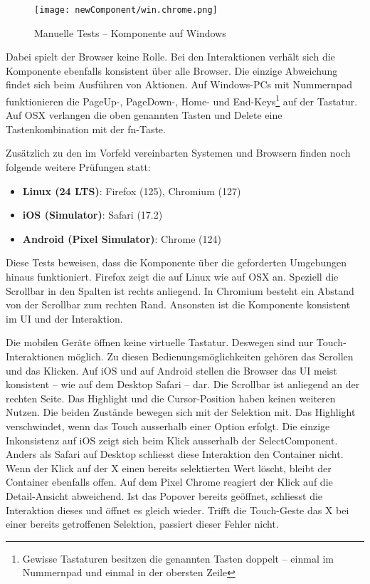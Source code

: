 \begin{figure}[!htb]
    \centering
    \texttt{[image: newComponent/win.chrome.png]}
    \caption{\centering Manuelle Tests – Komponente auf Windows}
    \label{img:manualTestComponentWin}
\end{figure}

Dabei spielt der Browser keine Rolle. 
Bei den Interaktionen verhält sich die Komponente ebenfalls konsistent über alle Browser. 
Die einzige Abweichung findet sich beim Ausführen von Aktionen. 
Auf Windows-PCs mit Nummernpad funktionieren die Page\-Up-, Page\-Down-, Home- und End-Keys\footnote{
    Gewisse Tastaturen besitzen die genannten Tasten doppelt – einmal im Nummernpad und einmal in der obersten Zeile
} auf der Tastatur. 
Auf OSX verlangen die oben genannten Tasten und Delete eine Tastenkombination mit der fn-Taste. 

Zusätzlich zu den im Vorfeld vereinbarten Systemen und Browsern finden noch folgende weitere Prüfungen statt: 

\begin{itemize}
    \item \textbf{Linux (24 LTS)}: Firefox (125), Chromium (127)
    \item \textbf{iOS (Simulator)}: Safari (17.2)
    \item \textbf{Android (Pixel Simulator)}: Chrome (124)
\end{itemize}

Diese Tests beweisen, dass die Komponente über die geforderten Umgebungen hinaus funktioniert. 
Firefox zeigt die  auf Linux wie auf OSX an. 
Speziell die Scrollbar in den Spalten ist rechts anliegend. 
In Chromium besteht ein Abstand von der Scrollbar zum rechten Rand. 
Ansonsten ist die Komponente konsistent im UI und der Interaktion. 

Die mobilen Geräte öffnen keine virtuelle Tastatur. 
Deswegen sind nur Touch-Inter\-aktionen möglich. 
Zu diesen Bedienungsmöglichkeiten gehören das Scrollen und das Klicken. 
Auf iOS und auf Android stellen die Browser das UI meist konsistent – wie auf dem Desktop Safari – dar. 
Die Scrollbar ist anliegend an der rechten Seite. 
Das Highlight und die Cursor-Position haben keinen weiteren Nutzen. 
Die beiden Zustände bewegen sich mit der Selektion mit. 
Das Highlight verschwindet, wenn das Touch ausserhalb einer Option erfolgt. 
Die einzige Inkonsistenz auf iOS zeigt sich beim Klick ausserhalb der SelectComponent. 
Anders als Safari auf Desktop schliesst diese Interaktion den Container nicht. 
Wenn der Klick auf der X einen bereits selektierten Wert löscht, bleibt der Container ebenfalls offen. 
Auf dem Pixel Chrome reagiert der Klick auf die Detail-Ansicht abweichend. 
Ist das Popover bereits geöffnet, schliesst die Interaktion dieses und öffnet es gleich wieder. 
Trifft die Touch-Geste das X bei einer bereits getroffenen Selektion, passiert dieser Fehler nicht.  

